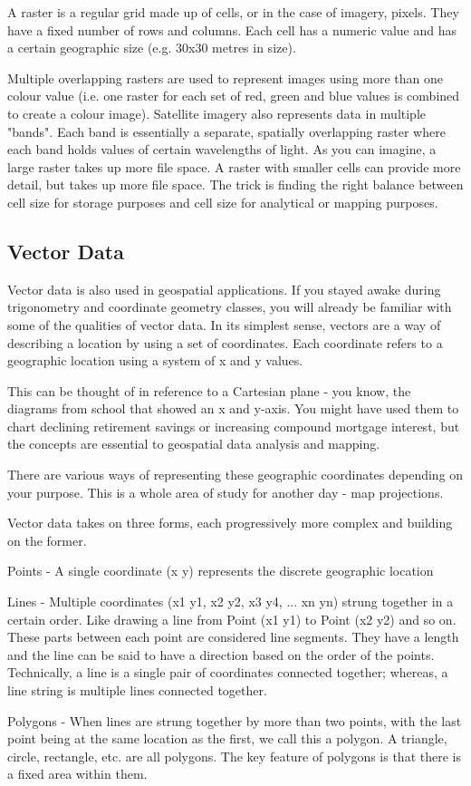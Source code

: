 A raster is a regular grid made up of cells, or in the case of imagery,
pixels. They have a fixed number of rows and columns. Each cell has a numeric
value and has a certain geographic size (e.g. 30x30 metres in size).

Multiple overlapping rasters are used to represent images using more than one
colour value (i.e. one raster for each set of red, green and blue values is
combined to create a colour image). Satellite imagery also represents data in
multiple "bands". Each band is essentially a separate, spatially overlapping
raster where each band holds values of certain wavelengths of light. As you
can imagine, a large raster takes up more file space. A raster with smaller
cells can provide more detail, but takes up more file space. The trick is
finding the right balance between cell size for storage purposes and cell size
for analytical or mapping purposes.

\subsection{Vector Data}
Vector data is also used in geospatial applications. If you stayed awake
during trigonometry and coordinate geometry classes, you will already be
familiar with some of the qualities of vector data. In its simplest sense,
vectors are a way of describing a location by using a set of coordinates. Each
coordinate refers to a geographic location using a system of x and y values.

This can be thought of in reference to a Cartesian plane - you know, the
diagrams from school that showed an x and y-axis. You might have used them to
chart declining retirement savings or increasing compound mortgage interest,
but the concepts are essential to geospatial data analysis and mapping.

There are various ways of representing these geographic coordinates depending
on your purpose. This is a whole area of study for another day - map
projections.

Vector data takes on three forms, each progressively more complex and building
on the former.  
\begin{compactenum}
\item Points - A single coordinate (x y) represents the discrete geographic location
\item Lines - Multiple coordinates (x1 y1, x2 y2, x3 y4, ... xn yn) strung
together in a certain order. Like drawing a line from Point (x1 y1) to Point
(x2 y2) and so on. These parts between each point are considered line
segments. They have a length and the line can be said to have a direction
based on the order of the points. Technically, a line is a single pair of
coordinates connected together; whereas, a line string is multiple lines
connected together.  
\item Polygons - When lines are strung together by more
than two points, with the last point being at the same location as the first,
we call this a polygon. A triangle, circle, rectangle, etc. are all polygons.
The key feature of polygons is that there is a fixed area within them.
\end{compactenum}


